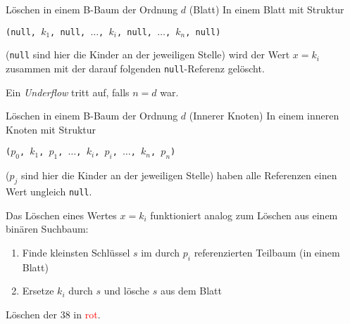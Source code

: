 \begin{algo}{Löschen in einem B-Baum der Ordnung $d$ (Blatt)}
    In einem Blatt mit Struktur
    \begin{center}
        \texttt{(null, $k_1$, null, $\ldots$, $k_i$, null, $\ldots$, $k_n$, null)}
    \end{center}
    (\texttt{null} sind hier die Kinder an der jeweiligen Stelle)
    wird der Wert $x = k_i$ zusammen mit der darauf folgenden \texttt{null}-Referenz gelöscht.

    Ein \emph{Underflow} tritt auf, falls $n=d$ war.
\end{algo}

\begin{algo}{Löschen in einem B-Baum der Ordnung $d$ (Innerer Knoten)}
    In einem inneren Knoten mit Struktur

    \begin{center}
        \texttt{($p_0$, $k_1$, $p_1$, $\ldots$, $k_i$, $p_i$, $\ldots$, $k_n$, $p_n$)}
    \end{center}

    ($p_j$ sind hier die Kinder an der jeweiligen Stelle)
    haben alle Referenzen einen Wert ungleich \texttt{null}.

    Das Löschen eines Wertes $x = k_i$ funktioniert analog zum Löschen aus einem binären Suchbaum:
    \begin{enumerate}
        \item Finde kleinsten Schlüssel $s$ im durch $p_i$ referenzierten Teilbaum (in einem Blatt)
        \item Ersetze $k_i$ durch $s$ und lösche $s$ aus dem Blatt
    \end{enumerate}

    Löschen der 38 in \textcolor{red}{rot}.

    \centering
    \vspace{1em}


\end{algo}
